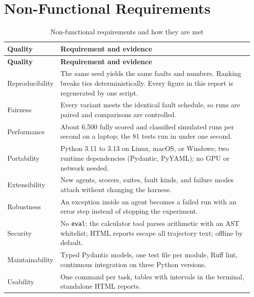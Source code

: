 \documentclass[12pt,a4paper,oneside]{report}
\begin{document}
\section{Non-Functional Requirements}
\begin{longtable}{p{3.2cm}p{10.4cm}}
\caption{Non-functional requirements and how they are met}\\
\toprule
\textbf{Quality} & \textbf{Requirement and evidence} \\
\midrule
\endfirsthead
\toprule
\textbf{Quality} & \textbf{Requirement and evidence} \\
\midrule
\endhead
Reproducibility & The same seed yields the same faults and numbers. Ranking breaks ties deterministically. Every figure in this report is regenerated by one script. \\
Fairness & Every variant meets the identical fault schedule, so runs are paired and comparisons are controlled. \\
Performance & About 6,500 fully scored and classified simulated runs per second on a laptop; the 81 tests run in under one second. \\
Portability & Python 3.11 to 3.13 on Linux, macOS, or Windows; two runtime dependencies (Pydantic, PyYAML); no GPU or network needed. \\
Extensibility & New agents, scorers, suites, fault kinds, and failure modes attach without changing the harness. \\
Robustness & An exception inside an agent becomes a failed run with an error step instead of stopping the experiment. \\
Security & No \texttt{eval}: the calculator tool parses arithmetic with an AST whitelist; HTML reports escape all trajectory text; offline by default. \\
Maintainability & Typed Pydantic models, one test file per module, Ruff lint, continuous integration on three Python versions. \\
Usability & One command per task, tables with intervals in the terminal, standalone HTML reports. \\
\bottomrule
\end{longtable}
\end{document}
